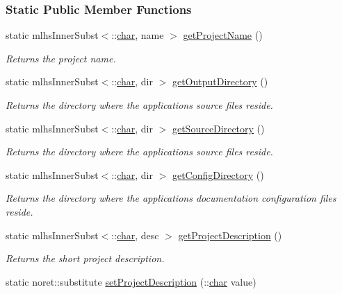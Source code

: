 \subsubsection*{Static Public Member Functions}
\begin{DoxyCompactItemize}
\item 
static mlhs\+Inner\+Subst$<$\+::\hyperlink{classchar}{char}, name $>$ \hyperlink{class_matlab_doc_maker_a9f84ff8d3f39824b54626862780b342c}{get\+Project\+Name} ()
\begin{DoxyCompactList}\small\item\em Returns the project name. \end{DoxyCompactList}\item 
static mlhs\+Inner\+Subst$<$\+::\hyperlink{classchar}{char}, dir $>$ \hyperlink{class_matlab_doc_maker_a1957c12ff4fb6a9d8e1b009961a5f499}{get\+Output\+Directory} ()
\begin{DoxyCompactList}\small\item\em Returns the directory where the applications source files reside. \end{DoxyCompactList}\item 
static mlhs\+Inner\+Subst$<$\+::\hyperlink{classchar}{char}, dir $>$ \hyperlink{class_matlab_doc_maker_a1481c6e95be338b758ec97b8090ee7c9}{get\+Source\+Directory} ()
\begin{DoxyCompactList}\small\item\em Returns the directory where the applications source files reside. \end{DoxyCompactList}\item 
static mlhs\+Inner\+Subst$<$\+::\hyperlink{classchar}{char}, dir $>$ \hyperlink{class_matlab_doc_maker_a11a2a8ec616df969a911b325e39b0b4f}{get\+Config\+Directory} ()
\begin{DoxyCompactList}\small\item\em Returns the directory where the applications documentation configuration files reside. \end{DoxyCompactList}\item 
static mlhs\+Inner\+Subst$<$\+::\hyperlink{classchar}{char}, desc $>$ \hyperlink{class_matlab_doc_maker_af63bb7f2a5008a7b786d2b83b4f72b1b}{get\+Project\+Description} ()
\begin{DoxyCompactList}\small\item\em Returns the short project description. \end{DoxyCompactList}\item 
static noret\+::substitute \hyperlink{class_matlab_doc_maker_a88037a33f6ed26b8b3e60e1cbfd5dfd6}{set\+Project\+Description} (\+::\hyperlink{classchar}{char} value)

\end{DoxyCompactItemize}
